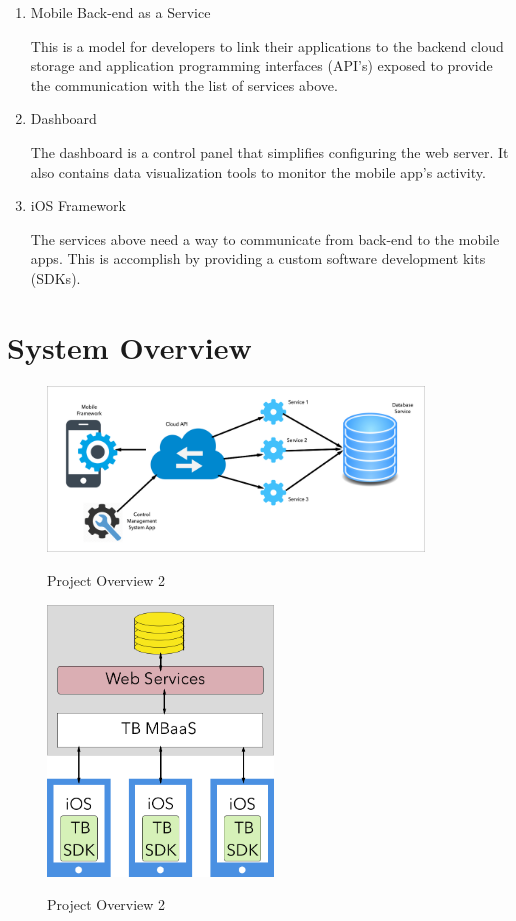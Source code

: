 \begin{enumerate}
   \item Mobile Back-end as a Service
  
    This is a model for developers to link their applications to the backend cloud storage and application programming interfaces (API's) exposed to provide the communication with the list of services above.
  \item Dashboard
  
    The dashboard is a control panel that simplifies configuring the web server. It also contains data visualization tools to monitor the mobile app's activity.
  \item iOS Framework
  
    The services above need a way to communicate from back-end to the mobile apps. This is accomplish by providing a custom software development kits (SDKs).
\end{enumerate}

\section{System Overview}

\begin{figure}[h]
    \caption{Project Overview 2}
    \centering
    \includegraphics[width=100mm]{images/overview}
    \label{fig:project_overview1}
\end{figure}

\begin{figure}[h]
    \caption{Project Overview 2}
    \centering
    \includegraphics[width=60mm]{images/app_overview}
    \label{fig:project_overview2}
\end{figure}

